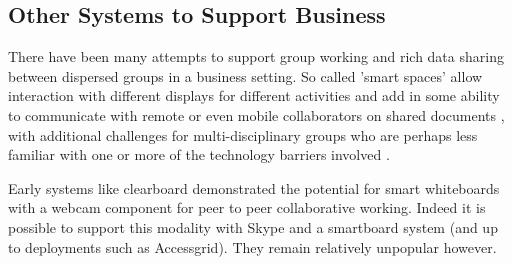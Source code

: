 \subsection{Other Systems to Support Business}                  
There have been many attempts to support group working and rich data sharing between dispersed groups in a business setting. So called 'smart spaces' allow interaction with different displays for different activities and add in some ability to communicate with remote or even mobile collaborators on shared documents \cite{Bardram2012}, with additional challenges for multi-disciplinary groups who are perhaps less familiar with one or more of the technology barriers involved \cite{Adamczyk2007}.\par
Early systems like clearboard \cite{Ishii1993} demonstrated the potential for smart whiteboards with a webcam component for peer to peer collaborative working. Indeed it is possible to support this modality with Skype and a smartboard system (and up to deployments such as Accessgrid). They remain relatively unpopular however.\par

